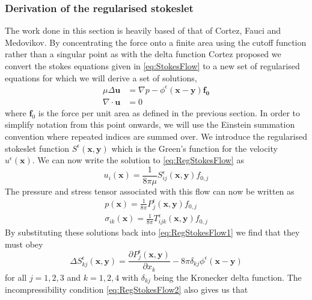 \subsubsection{Derivation of the regularised stokeslet}
The work done in this section is heavily based of that of Cortez, Fauci and Medovikov\cite{Cortez2001,Cortez2005}. By concentrating the force onto a finite area using the cutoff function rather than a singular point as with the delta function Cortez proposed we convert the stokes equations given in \cref{eq:StokesFlow} to a new set of regularised equations for which we will derive a set of solutions,
\begin{subequations}
\label{eq:RegStokesFlow}
\begin{align}
    \mu\Delta\boldsymbol{u} &= \nabla p - \phi^{\epsilon}(\bm{x}-\bm{y})\bm{f_0} \label{eq:RegStokesFlow1} \\
    \nabla \cdot \boldsymbol{u} &= 0 \label{eq:RegStokesFlow2}
\end{align}
\end{subequations}
where $\bm{f}_0$ is the force per unit area as defined in the previous section.
In order to simplify notation from this point onwards, we will use the Einstein summation convention where repeated indices are summed over. We introduce the regularised stokeslet function $S^\epsilon(\bm{x},\bm{y})$ which is the Green's function for the velocity $u^\epsilon(\bm{x})$. We can now write the solution to \cref{eq:RegStokesFlow} as
\begin{equation}
\label{eq:regvelsol}
    u_i(\bm{x}) = \frac{1}{8\pi\mu}S^\epsilon_{ij}(\bm{x},\bm{y})f_{0,j}
\end{equation}
The pressure and stress tensor associated with this flow can now be written as
\begin{gather}
\label{eq:regpressuresol}
    p(\bm{x}) = \frac{1}{8\pi}P^\epsilon_{j}(\bm{x},\bm{y})f_{0,j}\\
\label{eq:regstresssol}
    \sigma_{ik}(\bm{x}) = \frac{1}{8\pi}T^\epsilon_{ijk}(\bm{x},\bm{y})f_{0,j}
\end{gather}
By substituting these solutions back into \cref{eq:RegStokesFlow1} we find that they must obey
\begin{equation}
\label{eq:regcondition1}
    \Delta S^\epsilon_{kj}(\bm{x},\bm{y}) = \frac{\partial P^\epsilon_{j}(\bm{x},\bm{y})}{\partial x_k} - 8\pi\delta_{kj}\phi^\epsilon(\bm{x}-\bm{y})
\end{equation}
for all $j=1,2,3$ and $k=1,2,4$ with $\delta_{kj}$ being the Kronecker delta function. The incompressibility condition \cref{eq:RegStokesFlow2} also gives us that
